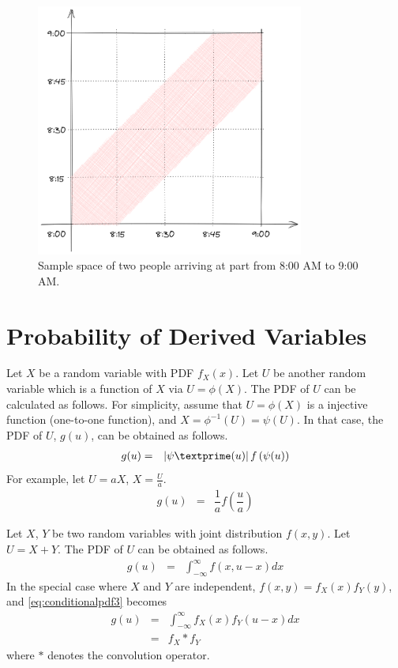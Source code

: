 \begin{figure}
	\centering
	\includegraphics[width=250pt]{chapters/ch-random-variables/figures/geometricprobexp.png}
	\caption{Sample space of two people arriving at part from 8:00 AM to 9:00 AM.} \label{fig:geometricprobexp}
\end{figure}

\section{Probability of Derived Variables}

Let $X$ be a random variable with PDF $f_X(x)$. Let $U$ be another random variable which is a function of $X$ via $U=\phi(X)$. The PDF of $U$ can be calculated as follows. For simplicity, assume that $U=\phi(X)$ is a injective function (one-to-one function), and $X=\phi^{-1}(U)=\psi(U)$. In that case, the PDF of $U$, $g(u)$, can be obtained as follows.
\begin{eqnarray}
  g(u) &=& \left|\psi\textprime(u)\right|f\left(\psi(u)\right) \nonumber
\end{eqnarray}
For example, let $U=aX$, $X=\frac{U}{a}$.
\begin{eqnarray}
  g(u) &=& \dfrac{1}{a}f\left(\dfrac{u}{a}\right) \nonumber
\end{eqnarray}

Let $X$, $Y$ be two random variables with joint distribution $f(x, y)$. Let $U=X+Y$. The PDF of $U$ can be obtained as follows.
\begin{eqnarray}
  g(u) &=& \int_{-\infty}^{\infty} f(x, u-x)dx \label{eq:conditionalpdf3}
\end{eqnarray}
In the special case where $X$ and $Y$ are independent, $f(x, y) = f_X(x)f_Y(y)$, and \eqref{eq:conditionalpdf3} becomes
\begin{eqnarray}
  g(u) &=& \int_{-\infty}^{\infty} f_X(x)f_Y(u-x)dx \nonumber \\
  &=& f_X * f_Y \nonumber
\end{eqnarray}
where $*$ denotes the convolution operator.
